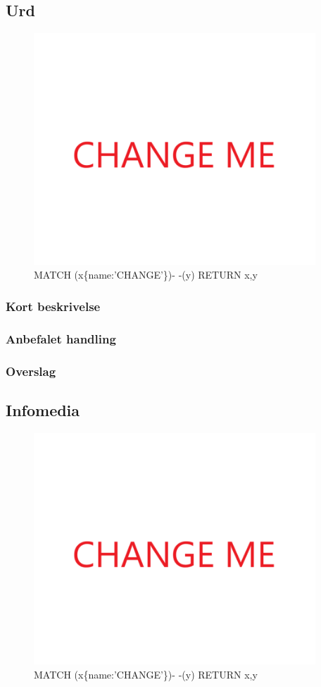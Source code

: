 \documentclass{article}
\begin{document}
\subsection{Urd}
\begin{figure}[h]
\includegraphics[width=300pt]{CHANGE.PNG}
\caption{MATCH (x\{name:'CHANGE'\})- -(y) RETURN x,y}
\end{figure}
\subsubsection{Kort beskrivelse}
\subsubsection{Anbefalet handling}
\subsubsection{Overslag}


\subsection{Infomedia}
\begin{figure}[h]
\includegraphics[width=300pt]{CHANGE.PNG}
\caption{MATCH (x\{name:'CHANGE'\})- -(y) RETURN x,y}
\end{figure}
\end{document}
